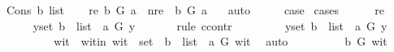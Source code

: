 \begin{isabellebody}
\ {\isacharparenleft}{\kern0pt}Cons\ b\ list{\isacharparenright}{\kern0pt}\isanewline
\ \ \isamarkupfalse%
\ {\isacharparenleft}{\kern0pt}re{\isacharparenright}{\kern0pt}\ {\isachardoublequoteopen}b\ {\isasymrightarrow}\isactrlsup {\isacharplus}{\kern0pt}\isactrlbsub G\isactrlesub \ a{\isachardoublequoteclose}\ {\isacharbar}{\kern0pt}\ {\isacharparenleft}{\kern0pt}nre{\isacharparenright}{\kern0pt}\ {\isachardoublequoteopen}{\isasymnot}\ b\ {\isasymrightarrow}\isactrlsup {\isacharplus}{\kern0pt}\isactrlbsub G\isactrlesub \ a\ {\isachardoublequoteclose}\ \isamarkupfalse%
\ auto\isanewline
\ \ \isamarkupfalse%
\ \isamarkupfalse%
\ {\isacharquery}{\kern0pt}case\ \isamarkupfalse%
{\isacharparenleft}{\kern0pt}cases{\isacharparenright}{\kern0pt}\isanewline
\ \ \ \ \isamarkupfalse%
\ re\isanewline
\ \ \ \ \isamarkupfalse%
\ {\isachardoublequoteopen}{\isacharparenleft}{\kern0pt}{\isasymforall}y{\isasymin}set\ {\isacharparenleft}{\kern0pt}b\ {\isacharhash}{\kern0pt}\ list{\isacharparenright}{\kern0pt}{\isachardot}{\kern0pt}\ {\isasymnot}\ a\ {\isasymrightarrow}\isactrlsup {\isacharplus}{\kern0pt}\isactrlbsub G\isactrlesub \ y\ {\isacharparenright}{\kern0pt}{\isachardoublequoteclose}\ \isanewline
\ \ \ \ \isamarkupfalse%
{\isacharparenleft}{\kern0pt}rule\ ccontr{\isacharparenright}{\kern0pt}\isanewline
\ \ \ \ \ \ \isamarkupfalse%
\ {\isachardoublequoteopen}{\isasymnot}\ {\isacharparenleft}{\kern0pt}{\isasymforall}y{\isasymin}set\ {\isacharparenleft}{\kern0pt}b\ {\isacharhash}{\kern0pt}\ list{\isacharparenright}{\kern0pt}{\isachardot}{\kern0pt}\ {\isasymnot}\ a\ {\isasymrightarrow}\isactrlsup {\isacharplus}{\kern0pt}\isactrlbsub G\isactrlesub \ y{\isacharparenright}{\kern0pt}{\isachardoublequoteclose}\isanewline
\ \ \ \ \ \ \isamarkupfalse%
\ \isamarkupfalse%
\ wit\ \ wit{\isacharunderscore}{\kern0pt}in{\isacharcolon}{\kern0pt}\ {\isachardoublequoteopen}wit\ {\isasymin}\ set\ \ {\isacharparenleft}{\kern0pt}b\ {\isacharhash}{\kern0pt}\ list{\isacharparenright}{\kern0pt}\ {\isasymand}\ a\ {\isasymrightarrow}\isactrlsup {\isacharplus}{\kern0pt}\isactrlbsub G\isactrlesub \ wit{\isachardoublequoteclose}\ \isamarkupfalse%
\ auto\isanewline
\ \ \ \ \ \ \isamarkupfalse%
\ \isamarkupfalse%
\ {\isachardoublequoteopen}b\ {\isasymrightarrow}\isactrlsup {\isacharplus}{\kern0pt}\isactrlbsub G\isactrlesub \ wit{\isachardoublequoteclose}\ \isamarkupfalse%

\end{isabellebody}
